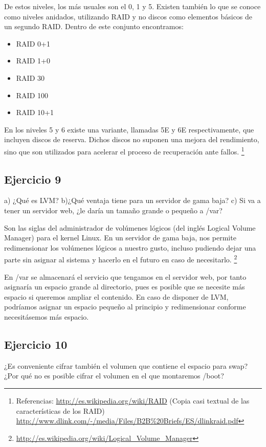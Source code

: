 \documentclass[a4paper, 11pt]{article} %
\begin{document}
De estos niveles, los más usuales son el 0, 1 y 5.
Existen también lo que se conoce como niveles anidados, utilizando RAID y no discos como elementos básicos de un segundo RAID. Dentro de este conjunto encontramos: 
\begin{itemize}
\item RAID 0+1
\item RAID 1+0
\item RAID 30
\item RAID 100
\item RAID 10+1
\end{itemize}

En los niveles 5 y 6 existe una variante, llamadas 5E y 6E respectivamente, que incluyen discos de reserva. Dichos discos no suponen una mejora del rendimiento, sino que son utilizados para acelerar el proceso de recuperación ante fallos. 
\footnote{Referencias: \url{http://es.wikipedia.org/wiki/RAID} (Copia casi textual de las características de los RAID) \\ \url{http://www.dlink.com/-/media/Files/B2B\%20Briefs/ES/dlinkraid.pdf}}


\subsection*{Ejercicio 9}
a) ¿Qué es LVM? b)¿Qué ventaja tiene para un servidor de gama baja? c)
Si va a tener un servidor web, ¿le daría un tamaño grande o pequeño a /var?

Son las siglas del administrador de volúmenes lógicos (del inglés Logical Volume Manager) para el kernel Linux. 
En un servidor de gama baja, nos permite redimensionar los volúmenes lógicos a nuestro gusto, incluso pudiendo dejar una parte sin asignar al sistema y hacerlo en el futuro en caso de necesitarlo. 
\footnote{\url{http://es.wikipedia.org/wiki/Logical_Volume_Manager}}

En /var se almacenará el servicio que tengamos en el servidor web, por tanto asignaría un espacio grande al directorio, pues es posible que se necesite más espacio si queremos ampliar el contenido. En caso de disponer de LVM, podríamos asignar un espacio pequeño al principio y redimensionar conforme necesitásemos más espacio. 


\subsection*{Ejercicio 10}
¿Es conveniente cifrar también el volumen que contiene el espacio para
swap? ¿Por qué no es posible cifrar el volumen en el que montaremos /boot?
\end{document}
